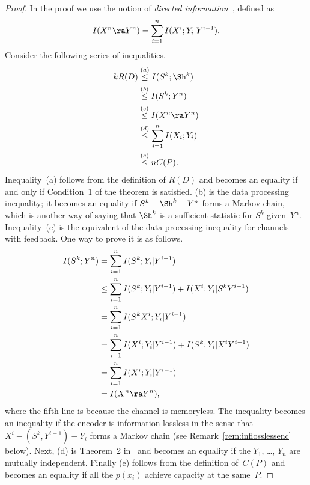 \begin{proof}
  In the proof we use the notion of \emph{directed
  information}~\cite{Massey1990,Kramer1998}, defined as
  \begin{equation*}
    I(X^n \ra Y^n) = \sum_{i=1}^n I(X^i; Y_i | Y^{i-1}).
  \end{equation*}
  Consider the following series of inequalities.
  \begin{align*}
    kR(D) &\stackrel{(a)}{\le} I(S^k; \Sh^k) \\
    &\stackrel{(b)}{\le} I(S^k; Y^n) \\
    &\stackrel{(c)}{\le} I(X^n \ra Y^n) \\
    &\stackrel{(d)}{\le} \sum_{i=1}^n I(X_i; Y_i) \\
    &\stackrel{(e)}{\le} nC(P).
  \end{align*}
  Inequality~(a) follows from the definition of $R(D)$ and becomes an equality
  if and only if Condition~1 of the theorem is satisfied. (b) is the data
  processing inequality; it becomes an equality if $S^k - \Sh^k - Y^n$ forms a
  Markov chain, which is another way of saying that $\Sh^k$ is a sufficient
  statistic for $S^k$ given~$Y^n$.  Inequality~(c) is the equivalent of the data
  processing inequality for channels with feedback. One way to prove it is as
  follows.
  \begin{align*}
    I(S^k; Y^n)
    &= \sum_{i=1}^n I(S^k; Y_i | Y^{i-1}) \\
    &\le \sum_{i=1}^n I(S^k; Y_i | Y^{i-1}) + I(X^i;Y_i | S^k Y^{i-1}) \\
    &= \sum_{i=1}^n I(S^k X^i; Y_i | Y^{i-1}) \\
    &= \sum_{i=1}^n I(X^i; Y_i | Y^{i-1}) + I(S^k; Y_i | X^i Y^{i-1}) \\
    &= \sum_{i=1}^n I(X^i; Y_i | Y^{i-1}) \\
    &= I(X^n \ra Y^n),
  \end{align*}
  where the fifth line is because the channel is memoryless.
  The inequality becomes an inequality if the encoder is information lossless in
  the sense that $X^i - (S^k, Y^{i-1}) - Y_i$ forms a Markov chain (see
  Remark~\ref{rem:inflosslessenc} below). Next, (d) is Theorem~2
  in~\cite{Massey1990} and becomes an equality if the $Y_1$, \dots, $Y_n$ are
  mutually independent. Finally (e) follows from the definition of~$C(P)$ and
  becomes an equality if all the $p(x_i)$ achieve capacity at the same~$P$. 
\end{proof}


